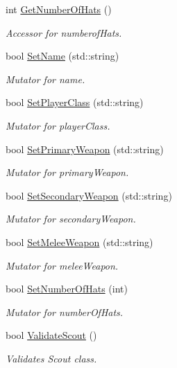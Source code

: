 \begin{DoxyCompactItemize}
int \hyperlink{class_player_aabfc94e78f3ce77c474492d770365753}{Get\+Number\+Of\+Hats} ()
\begin{DoxyCompactList}\small\item\em Accessor for numberof\+Hats. \end{DoxyCompactList}\item 
bool \hyperlink{class_player_a8bf1b3dc1805bd3dc5e44531fac4ec1a}{Set\+Name} (std\+::string)
\begin{DoxyCompactList}\small\item\em Mutator for name. \end{DoxyCompactList}\item 
bool \hyperlink{class_player_a8e58ce8b9ed8f2f40892e7aabcde5174}{Set\+Player\+Class} (std\+::string)
\begin{DoxyCompactList}\small\item\em Mutator for player\+Class. \end{DoxyCompactList}\item 
bool \hyperlink{class_player_af654a4cc13cb5b2f511cded164e662a7}{Set\+Primary\+Weapon} (std\+::string)
\begin{DoxyCompactList}\small\item\em Mutator for primary\+Weapon. \end{DoxyCompactList}\item 
bool \hyperlink{class_player_a2a97aa0d222b674329c2c179b8bfc05f}{Set\+Secondary\+Weapon} (std\+::string)
\begin{DoxyCompactList}\small\item\em Mutator for secondary\+Weapon. \end{DoxyCompactList}\item 
bool \hyperlink{class_player_a169c7512b6f03558fc322a603b19d5f1}{Set\+Melee\+Weapon} (std\+::string)
\begin{DoxyCompactList}\small\item\em Mutator for melee\+Weapon. \end{DoxyCompactList}\item 
bool \hyperlink{class_player_af3fe2c81e1cb35fdd0cc532a92f99c8c}{Set\+Number\+Of\+Hats} (int)
\begin{DoxyCompactList}\small\item\em Mutator for number\+Of\+Hats. \end{DoxyCompactList}\item 
bool \hyperlink{class_player_a52ae7c50757f701a119b042e8a991624}{Validate\+Scout} ()
\begin{DoxyCompactList}\small\item\em Validates Scout class. \end{DoxyCompactList}\item 

\end{DoxyCompactItemize}
